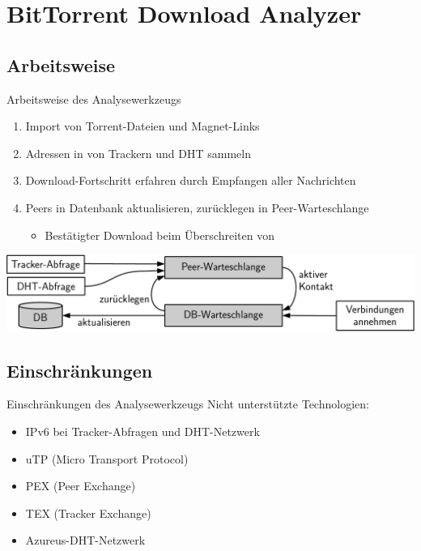 \documentclass[dvipsnames]{beamer} %
\begin{document}
	\section{BitTorrent Download Analyzer}
	\subsection{Arbeitsweise}
	\begin{frame}{Arbeitsweise des Analysewerkzeugs}
		\begin{enumerate}
			\item \alert{Import} von Torrent-Dateien und Magnet-Links
			\item \alert{Adressen} in von Trackern und DHT sammeln
			\item \alert{Download-Fortschritt} erfahren durch Empfangen aller Nachrichten
			\item Peers in \alert{Datenbank} aktualisieren, zurücklegen in Peer-Warteschlange
			\begin{itemize}
				\item Bestätigter Download beim Überschreiten von 
			\end{itemize}
		\end{enumerate}

		\vspace{0.7cm}
    \includegraphics[width=\textwidth]{components-crop}
	\end{frame}

	\subsection{Einschränkungen}
	\begin{frame}{Einschränkungen des Analysewerkzeugs}
		Nicht unterstützte Technologien:

		\begin{itemize}
			\item IPv6 bei Tracker-Abfragen und DHT-Netzwerk
			\item uTP (Micro Transport Protocol)
			\item PEX (Peer Exchange)
			\item TEX (Tracker Exchange)
			\item Azureus-DHT-Netzwerk
		\end{itemize}
	\end{frame}
\end{document}
